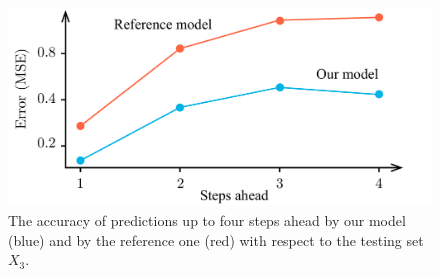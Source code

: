 \begin{figure}[t]
  \centering
  \includegraphics[width=1.0\columnwidth]{include/assets/figures/testing.pdf}
  \vspace{-1.5em}
  \caption{
    The accuracy of predictions up to four steps ahead by our model (blue) and
    by the reference one (red) with respect to the testing set $X_3$.
  }
  \vspace{-1.5em}
\end{figure}
